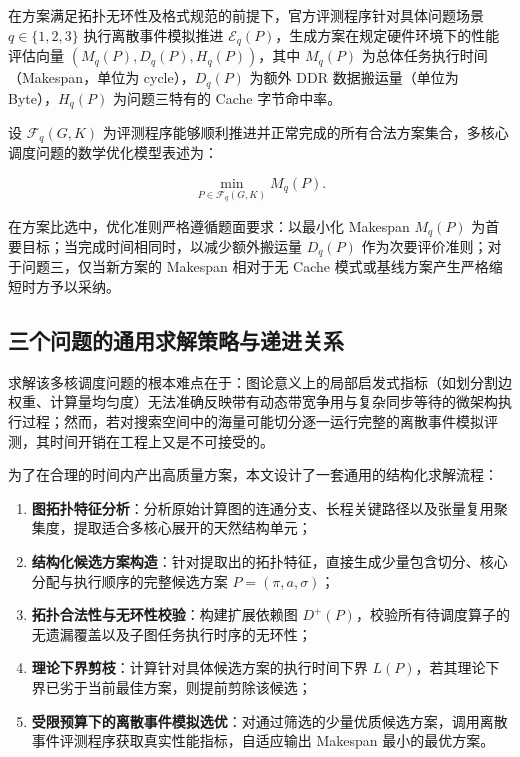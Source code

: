 \documentclass[anonymous,notoc]{gmcm2026}
\providecommand{\tightlist}{\setlength{\itemsep}{0pt}\setlength{\parskip}{0pt}}
\begin{document}
在方案满足拓扑无环性及格式规范的前提下，官方评测程序针对具体问题场景 \(q \in \{1, 2, 3\}\) 执行离散事件模拟推进 \(\mathcal{E}_q(P)\)，生成方案在规定硬件环境下的性能评估向量 \((M_q(P), D_q(P), H_q(P))\)，其中 \(M_q(P)\) 为总体任务执行时间（Makespan，单位为 cycle），\(D_q(P)\) 为额外 DDR 数据搬运量（单位为 Byte），\(H_q(P)\) 为问题三特有的 Cache 字节命中率。

设 \(\mathcal{F}_q(G, K)\) 为评测程序能够顺利推进并正常完成的所有合法方案集合，多核心调度问题的数学优化模型表述为：

\[\min_{P \in \mathcal{F}_q(G, K)} M_q(P).\]

在方案比选中，优化准则严格遵循题面要求：以最小化 Makespan \(M_q(P)\) 为首要目标；当完成时间相同时，以减少额外搬运量 \(D_q(P)\) 作为次要评价准则；对于问题三，仅当新方案的 Makespan 相对于无 Cache 模式或基线方案产生严格缩短时方予以采纳。

\subsection{三个问题的通用求解策略与递进关系}

求解该多核调度问题的根本难点在于：图论意义上的局部启发式指标（如划分割边权重、计算量均匀度）无法准确反映带有动态带宽争用与复杂同步等待的微架构执行过程；然而，若对搜索空间中的海量可能切分逐一运行完整的离散事件模拟评测，其时间开销在工程上又是不可接受的。

为了在合理的时间内产出高质量方案，本文设计了一套通用的结构化求解流程：

\begin{enumerate}
\def\labelenumi{\arabic{enumi}.}
\tightlist
\item
  \textbf{图拓扑特征分析}：分析原始计算图的连通分支、长程关键路径以及张量复用聚集度，提取适合多核心展开的天然结构单元；
\item
  \textbf{结构化候选方案构造}：针对提取出的拓扑特征，直接生成少量包含切分、核心分配与执行顺序的完整候选方案 \(P = (\pi, a, \sigma)\)；
\item
  \textbf{拓扑合法性与无环性校验}：构建扩展依赖图 \(D^+(P)\)，校验所有待调度算子的无遗漏覆盖以及子图任务执行时序的无环性；
\item
  \textbf{理论下界剪枝}：计算针对具体候选方案的执行时间下界 \(L(P)\)，若其理论下界已劣于当前最佳方案，则提前剪除该候选；
\item
  \textbf{受限预算下的离散事件模拟选优}：对通过筛选的少量优质候选方案，调用离散事件评测程序获取真实性能指标，自适应输出 Makespan 最小的最优方案。
\end{enumerate}
\end{document}
